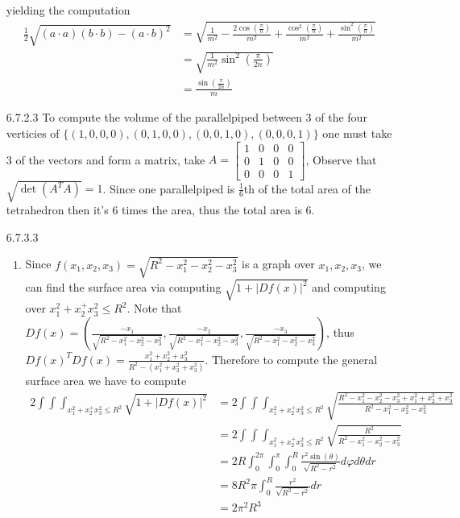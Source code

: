 \documentclass[12pt, letterpaper]{article}
\begin{document}
\begin{enumerate}
	yielding the computation 
	\begin{align*}
	\frac{1}{2}\sqrt{(a\cdot a)(b \cdot b) - (a \cdot b)^2}
	&= \sqrt{\frac{1}{m^2} - \frac{2\cos(\frac{\pi}{n})}{m^2}+ 
	\frac{\cos^2(\frac{\pi}{n})}{m^2}+ 
	\frac{\sin^2(\frac{\pi}{n})}{m^2}} \\ 
	&= \sqrt{\frac{1}{m^2} \sin^2(\frac{\pi}{2n})}\\
	&= \frac{\sin(\frac{\pi}{2n})}{m}
	\end{align*}
	\item[6.7.2.3] To compute the volume of the parallelpiped between 3 of the four verticies of 
	$\{(1,0,0,0),(0,1,0,0),(0,0,1,0),(0,0,0,1)\}$ one 
	must take 3 of the vectors and form a matrix, take
	$A = \begin{bmatrix}
	1 & 0 & 0 & 0\\
	0 & 1 & 0 & 0\\
	0 & 0 & 0 & 1
\end{bmatrix}	 $, Observe that 
$\sqrt{\det(A^T A)} = 1$.  Since one parallelpiped is 
$\frac{1}{6}$th of the total area of the tetrahedron then 
it's 6 times the area, thus the total area is 6.  
	\item[6.7.3.3] 
	\begin{enumerate}
		\item Since $f(x_1,x_2,x_3) = \sqrt{R^2 - x_1^2- x_2^2- x_3^2}$ is a 
	graph over $x_1,x_2,x_3$, we can find the surface area via 
	computing $\sqrt{1 + |Df(x)|^2}$ and computing over 
	$x_1^2 + x_2^ + x_3^2 \leq R^2$.  Note that 
	$Df(x) = \left(\frac{-x_1}{\sqrt{R^2 - x_1^2- x_2^2- x_3^2}},
	\frac{-x_2}{\sqrt{R^2 - x_1^2- x_2^2- x_3^2}},
	\frac{-x_3}{\sqrt{R^2 - x_1^2- x_2^2- x_3^2}}\right)$, 
	thus $Df(x)^T Df(x) = 
	\frac{x_1^2 + x_2^2 + x_3^2}{R^2 - (x_1^2 + x_2^2 + x_3^2)}$.
	Therefore to compute the general surface area we have to compute
	\begin{align*}
	2\int \int \int_{x_1^2 + x_2^ + x_3^2 \leq R^2} \sqrt{1+ |Df(x)|^2} &=  2\int \int \int_{x_1^2 + x_2^ + x_3^2 \leq R^2} 
	\sqrt{\frac{R^2 - x_1^2- x_2^2- x_3^2 +x_1^2+
	x_2^2 + x_3^2}{R^2 - x_1^2- x_2^2- x_3^2}}\\ 
	&= 2\int \int \int_{x_1^2 + x_2^ + x_3^2 \leq R^2} 
	\sqrt{\frac{R^2 }{R^2 - x_1^2- x_2^2- x_3^2}}\\ 
	&= 2R \int_0^{2\pi}\int_0^\pi \int_0^R \frac{r^2 \sin(\theta)}{\sqrt{R^2 -r^2}} d\varphi d\theta d r\\
	&= 8R^2 \pi \int_0^R \frac{r^2}{\sqrt{R^2 - r^2}}  d r\\
	&= 2\pi^2 	R^3
	\end{align*}

\end{enumerate}
\end{enumerate}
\end{document}
